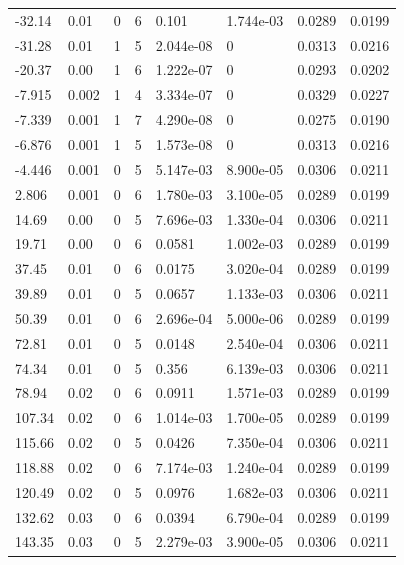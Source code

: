 \documentclass[preview]{standalone}
\begin{document}
{{\begin{tabular}{L{1.2cm}C{1.2cm} C{0.3cm}C{0.5cm} C{1.4cm}C{1.4cm} C{1.4cm}C{1.4cm}}
  -32.14  &  0.01  & 0     &  6 &  0.101  & 1.744e-03  & 0.0289 &  0.0199   \\ 
  -31.28  &  0.01  & 1     &  5 &  2.044e-08  & 0  & 0.0313 &  0.0216   \\ 
  -20.37  &  0.00  & 1     &  6 &  1.222e-07  & 0  & 0.0293 &  0.0202   \\ 
  -7.915  &  0.002  & 1     &  4 &  3.334e-07  & 0  & 0.0329 &  0.0227   \\ 
  -7.339  &  0.001  & 1     &  7 &  4.290e-08  & 0  & 0.0275 &  0.0190   \\ 
  -6.876  &  0.001  & 1     &  5 &  1.573e-08  & 0  & 0.0313 &  0.0216   \\ 
  -4.446  &  0.001  & 0     &  5 &  5.147e-03  & 8.900e-05  & 0.0306 &  0.0211   \\ 
  2.806  &  0.001  & 0     &  6 &  1.780e-03  & 3.100e-05  & 0.0289 &  0.0199   \\ 
  14.69  &  0.00  & 0     &  5 &  7.696e-03  & 1.330e-04  & 0.0306 &  0.0211   \\ 
  19.71  &  0.00  & 0     &  6 &  0.0581  & 1.002e-03  & 0.0289 &  0.0199   \\ 
  37.45  &  0.01  & 0     &  6 &  0.0175  & 3.020e-04  & 0.0289 &  0.0199   \\ 
  39.89  &  0.01  & 0     &  5 &  0.0657  & 1.133e-03  & 0.0306 &  0.0211   \\ 
  50.39  &  0.01  & 0     &  6 &  2.696e-04  & 5.000e-06  & 0.0289 &  0.0199   \\ 
  72.81  &  0.01  & 0     &  5 &  0.0148  & 2.540e-04  & 0.0306 &  0.0211   \\ 
  74.34  &  0.01  & 0     &  5 &  0.356  & 6.139e-03  & 0.0306 &  0.0211   \\ 
  78.94  &  0.02  & 0     &  6 &  0.0911  & 1.571e-03  & 0.0289 &  0.0199   \\ 
  107.34  &  0.02  & 0     &  6 &  1.014e-03  & 1.700e-05  & 0.0289 &  0.0199   \\ 
  115.66  &  0.02  & 0     &  5 &  0.0426  & 7.350e-04  & 0.0306 &  0.0211   \\ 
  118.88  &  0.02  & 0     &  6 &  7.174e-03  & 1.240e-04  & 0.0289 &  0.0199   \\ 
  120.49  &  0.02  & 0     &  5 &  0.0976  & 1.682e-03  & 0.0306 &  0.0211   \\ 
  132.62  &  0.03  & 0     &  6 &  0.0394  & 6.790e-04  & 0.0289 &  0.0199   \\ 
  143.35  &  0.03  & 0     &  5 &  2.279e-03  & 3.900e-05  & 0.0306 &  0.0211   \\ 

\end{tabular}}}
\end{document}
